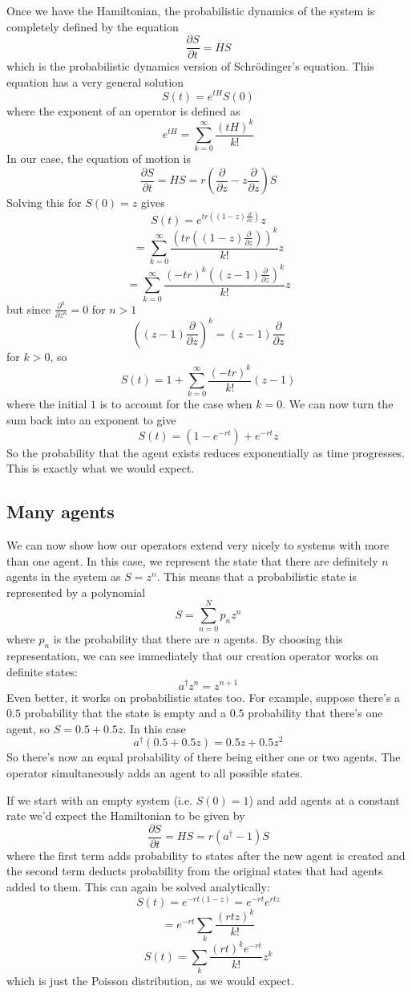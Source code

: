 \documentclass[letterpaper,twocolumn,10pt]{article}
\begin{document}
Once we have the Hamiltonian, the probabilistic dynamics of the system is completely defined by the equation
\[
\frac{\partial S}{\partial t} = HS
\]
which is the probabilistic dynamics version of Schr\"{o}dinger's equation. This equation has a very general solution
\[
S(t) = e^{tH}S(0)
\]
where the exponent of an operator is defined as
\[
e^{tH} = \sum_{k=0}^\infty \frac{(tH)^k}{k!}
\]
In our case, the equation of motion is
\[
\frac{\partial S}{\partial t} = HS = r\left(\frac{\partial }{\partial z} - z\frac{\partial }{\partial z}\right)S
\]
Solving this for $S(0) = z$ gives
\[
S(t) = e^{tr((1-z)\frac{\partial}{\partial z})}z
\]
\[
 = \sum_{k=0}^\infty \frac{\left(tr\left((1-z)\frac{\partial}{\partial z}\right)\right)^k}{k!}z
\]
\[
= \sum_{k=0}^\infty \frac{(-tr)^k\left((z-1)\frac{\partial}{\partial z}\right)^k}{k!}z
\]
but since $\frac{\partial^n}{\partial z^n} = 0$ for $n>1$
\[
\left((z-1)\frac{\partial}{\partial z}\right)^k = (z-1)\frac{\partial}{\partial z}
\]
for $k>0$, so
\[
S(t) = 1 + \sum_{k=0}^\infty \frac{(-tr)^k}{k!}(z-1)
\]
where the initial $1$ is to account for the case when $k=0$. We can now turn the sum back into an exponent to give
\[
S(t) = (1 - e^{-rt}) + e^{-rt}z
\]
So the probability that the agent exists reduces exponentially as time progresses. This is exactly what we would expect.

\subsection{Many agents}

We can now show how our operators extend very nicely to systems with more than one agent. In this case, we represent the state that there are definitely $n$ agents in the system as $S = z^n$. This means that a probabilistic state is represented by a polynomial
\[
S = \sum_{n=0}^N p_n z^n
\]
where $p_n$ is the probability that there are $n$ agents. By choosing this representation, we can see immediately that our creation operator works on definite states:
\[
a^\dag z^n = z^{n+1}
\]
Even better, it works on probabilistic states too. For example, suppose there's a $0.5$ probability that the state is empty and a $0.5$ probability that there's one agent, so $S = 0.5 + 0.5z$. In this case
\[
a^\dag (0.5 + 0.5z) = 0.5z + 0.5z^2
\]
So there's now an equal probability of there being either one or two agents. The operator simultaneously adds an agent to all possible states.

If we start with an empty system (i.e. $S(0) = 1$) and add agents at a constant rate we'd expect the Hamiltonian to be given by
\[
\frac{\partial S}{\partial t} = HS = r(a^\dag - 1)S
\]
where the first term adds probability to states after the new agent is created and the second term deducts probability from the original states that had agents added to them. This can again be solved analytically:
\[
S(t) = e^{-rt(1-z)} = e^{-rt}e^{rtz}
\]
\[
= e^{-rt}\sum_k \frac{(rtz)^k}{k!}
\]
\[
S(t) = \sum_k \frac{(rt)^ke^{-rt}}{k!}z^k
\]
which is just the Poisson distribution, as we would expect.
\end{document}
